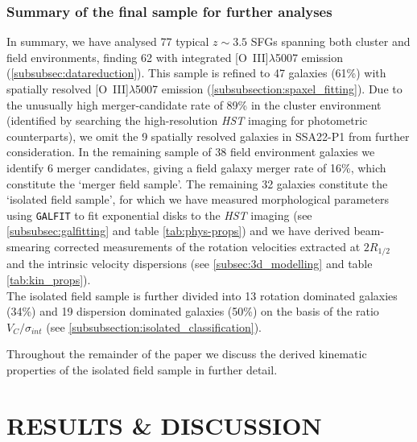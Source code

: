 \documentclass[fleqn,usenatbib]{mn2e}
\begin{document}
\subsubsection{Summary of the final sample for further analyses}\label{subsubsec:kin_sample_summary}
In summary, we have analysed 77 typical $z\sim3.5$ SFGs spanning both cluster and field environments, finding 62 with integrated [O~{\sc III}]$\lambda$5007 emission (\cref{subsubsec:datareduction}).
This sample is refined to 47 galaxies (61\%) with spatially resolved [O~{\sc III}]$\lambda$5007 emission (\cref{subsubsection:spaxel_fitting}).
Due to the unusually high merger-candidate rate of 89\% in the cluster environment (identified by searching the high-resolution {\em HST} imaging for photometric counterparts), we omit the 9 spatially resolved galaxies in SSA22-P1 from further consideration.
In the remaining sample of 38 field environment galaxies we identify 6 merger candidates, giving a field galaxy merger rate of 16\%, which constitute the `merger field sample'.
The remaining 32 galaxies constitute the `isolated field sample', for which we have measured morphological parameters using {\tt GALFIT} to fit exponential disks to the {\em HST} imaging (see \cref{subsubsec:galfitting} and table \ref{tab:phys-props}) and we have derived beam-smearing corrected measurements of the rotation velocities extracted at $2R_{1/2}$ and the intrinsic velocity dispersions (see \cref{subsec:3d_modelling} and table \ref{tab:kin_props}). \\

The isolated field sample is further divided into 13 rotation dominated galaxies (34\%) and 19 dispersion dominated galaxies (50\%) on the basis of the ratio $V_{C}/\sigma_{int}$ (see \cref{subsubsection:isolated_classification}).

Throughout the remainder of the paper we discuss the derived kinematic properties of the isolated field sample in further detail.

\section{RESULTS \& DISCUSSION}\label{sec:results}
\end{document}
